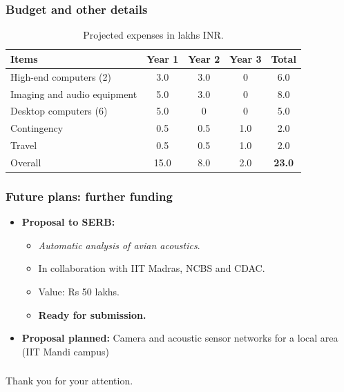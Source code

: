 \documentclass[mathserif]{beamer}
\begin{document}
\begin{frame}
\frametitle{Budget and other details}

\begin{table}[th]
\centering
\caption{Projected expenses in lakhs INR.}
\begin{tabular}{|l|c|c|c|c|}
\hline
Items & Year 1 & Year 2 & Year 3 & Total\\
\hline
High-end computers (2) & 3.0 & 3.0 & 0 & 6.0\\
Imaging and audio equipment & 5.0 & 3.0 & 0 & 8.0 \\
Desktop computers (6) & 5.0 & 0 & 0 & 5.0  \\
Contingency & 0.5 & 0.5 & 1.0 & 2.0 \\
Travel & 0.5 & 0.5 & 1.0 & 2.0\\
\hline
Overall & 15.0 & 8.0 & 2.0 & \textbf{23.0} \\
\hline
\end{tabular}
\label{tab:funding}
\end{table}
\end{frame}


\begin{frame}
\frametitle{Future plans: further funding}
\begin{itemize}
\item \textbf{Proposal to SERB:} 
	\begin{itemize}
	\item \textit{Automatic analysis of avian acoustics}. 
	\item In collaboration with IIT Madras, NCBS and CDAC. 
	\item Value: Rs 50 lakhs. 
	\item \textbf{Ready for submission.}
	\end{itemize}

\item \textbf{Proposal planned:} Camera and acoustic sensor networks for 
a local area (IIT Mandi campus)
\end{itemize}
\end{frame}


\begin{frame}
\frametitle{}
\Large{Thank you for your attention.}
\end{frame}
\end{document}
